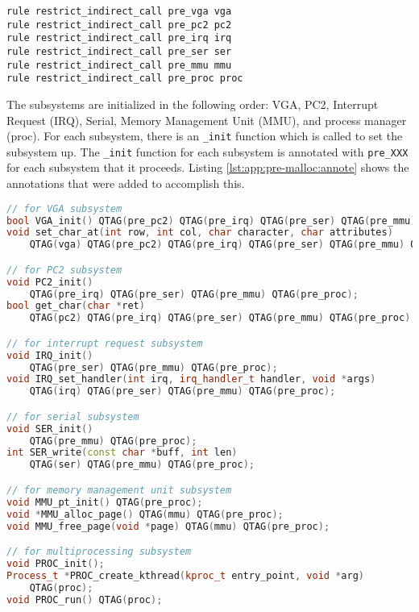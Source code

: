 \noindent\begin{minipage}[t]{\linewidth}
\begin{lstlisting}[caption={Rules file for a simple kernel written for CSC454.  The rules written here are intended to prevent code which runs before a subsystem is initialized from calling any function that depend on the subsystem.},label={lst:app:pre-malloc:rules}]
rule restrict_indirect_call pre_vga vga
rule restrict_indirect_call pre_pc2 pc2
rule restrict_indirect_call pre_irq irq
rule restrict_indirect_call pre_ser ser
rule restrict_indirect_call pre_mmu mmu
rule restrict_indirect_call pre_proc proc
\end{lstlisting}
\end{minipage}

The subsystems are initialized in the following order: VGA, PC2, Interrupt Request (IRQ), Serial, Memory Management Unit (MMU), and process manager (proc).  For each subsystem, there is an \lstinline{_init} function which is called to set the subsystem up.  The \lstinline{_init} function for each subsystem is annotated with \lstinline{pre_XXX} for each subsystem that it proceeds.  Listing \ref{lst:app:pre-malloc:annote} shows the annotations that were added to accomplish this.

\noindent\begin{lstlisting}[language=c++,caption={Lines inserted into C source for a simple kernel in order to prevent subsystems from depending on interfaces not yet initialized.},label={lst:app:pre-malloc:annote}]
// for VGA subsystem
bool VGA_init() QTAG(pre_pc2) QTAG(pre_irq) QTAG(pre_ser) QTAG(pre_mmu) QTAG(pre_proc);
void set_char_at(int row, int col, char character, char attributes)
    QTAG(vga) QTAG(pre_pc2) QTAG(pre_irq) QTAG(pre_ser) QTAG(pre_mmu) QTAG(pre_proc);

// for PC2 subsystem
void PC2_init()
    QTAG(pre_irq) QTAG(pre_ser) QTAG(pre_mmu) QTAG(pre_proc);
bool get_char(char *ret)
    QTAG(pc2) QTAG(pre_irq) QTAG(pre_ser) QTAG(pre_mmu) QTAG(pre_proc);

// for interrupt request subsystem
void IRQ_init()
    QTAG(pre_ser) QTAG(pre_mmu) QTAG(pre_proc);
void IRQ_set_handler(int irq, irq_handler_t handler, void *args)
    QTAG(irq) QTAG(pre_ser) QTAG(pre_mmu) QTAG(pre_proc);

// for serial subsystem
void SER_init()
    QTAG(pre_mmu) QTAG(pre_proc);
int SER_write(const char *buff, int len)
    QTAG(ser) QTAG(pre_mmu) QTAG(pre_proc);

// for memory management unit subsystem
void MMU_pt_init() QTAG(pre_proc);
void *MMU_alloc_page() QTAG(mmu) QTAG(pre_proc);
void MMU_free_page(void *page) QTAG(mmu) QTAG(pre_proc);

// for multiprocessing subsystem
void PROC_init();
Process_t *PROC_create_kthread(kproc_t entry_point, void *arg)
    QTAG(proc);
void PROC_run() QTAG(proc);
\end{lstlisting}

